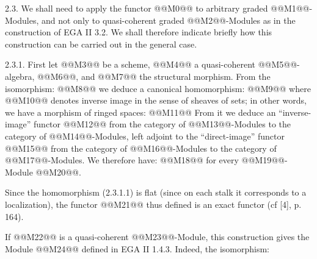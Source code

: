 2.3.
We shall need to apply the functor @@M0@@ to arbitrary graded @@M1@@-Modules, and not only to quasi-coherent graded @@M2@@-Modules as in the construction of EGA II 3.2. We shall therefore indicate briefly how this construction can be carried out in the general case.

2.3.1. First let @@M3@@ be a scheme, @@M4@@ a quasi-coherent @@M5@@-algebra, @@M6@@, and @@M7@@ the structural morphism. From the isomorphism:
@@M8@@
we deduce a canonical homomorphism:
@@M9@@
where @@M10@@ denotes inverse image in the sense of sheaves of sets; in other words, we have a morphism of ringed spaces:
@@M11@@
From it we deduce an ``inverse-image'' functor @@M12@@ from the category of @@M13@@-Modules to the category of @@M14@@-Modules, left adjoint to the ``direct-image'' functor @@M15@@ from the category of @@M16@@-Modules to the category of @@M17@@-Modules. We therefore have:
@@M18@@
for every @@M19@@-Module @@M20@@.

Since the homomorphism (2.3.1.1) is flat (since on each stalk it corresponds to a localization), the functor @@M21@@ thus defined is an exact functor (cf [4], p. 164).

If @@M22@@ is a quasi-coherent @@M23@@-Module, this construction gives the Module @@M24@@ defined in EGA II 1.4.3. Indeed, the isomorphism:
